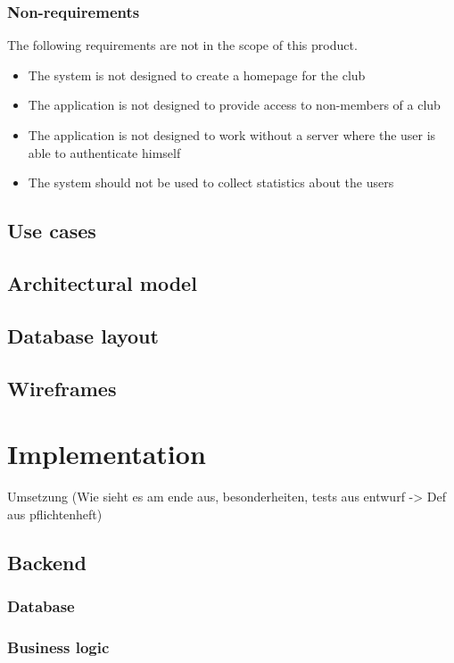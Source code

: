\subsection{Non-requirements} %
The following requirements are not in the scope of this product.
\begin{itemize}
\item The system is not designed to create a homepage for the club
\item The application is not designed to provide access to non-members of a club
\item The application is not designed to work without a server where the user is able to authenticate himself
\item The system should not be used to collect statistics about the users
\end{itemize}

\section{Use cases}

\section{Architectural model}

\section{Database layout}

\section{Wireframes}
\label{sec:Wireframes}

\chapter{Implementation}
Umsetzung (Wie sieht es am ende aus, besonderheiten, tests aus entwurf -> Def aus pflichtenheft)

\section{Backend}
\subsection{Database}
\subsection{Business logic}

